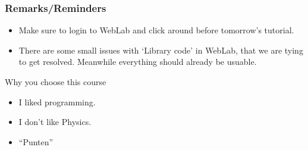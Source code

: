 \begin{frame}
	\frametitle{Remarks/Reminders}
	\begin{itemize}
		\item Make sure to login to WebLab and click around before tomorrow's tutorial.
		\item There are some small issues with `Library code' in WebLab, that we are tying to get resolved. Meanwhile
			everything should already be usuable.
	\end{itemize}
			\pause
				\begin{block}{Why you choose this course}
					\begin{itemize}
						\item I liked programming.
							\pause
						\item I don't like Physics.
							\pause
						\item ``Punten''
					\end{itemize}
				\end{block}	
\end{frame}


